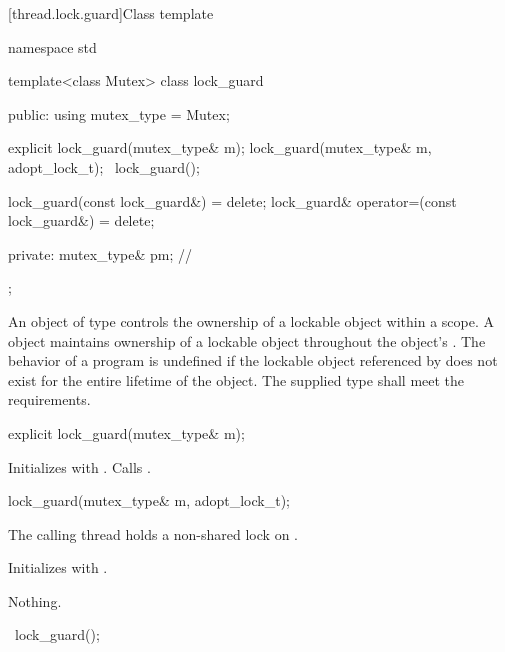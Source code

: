 [thread.lock.guard]{Class template }

%
\begin{codeblock}
namespace std {
  template<class Mutex>
  class lock_guard {
  public:
    using mutex_type = Mutex;

    explicit lock_guard(mutex_type& m);
    lock_guard(mutex_type& m, adopt_lock_t);
    ~lock_guard();

    lock_guard(const lock_guard&) = delete;
    lock_guard& operator=(const lock_guard&) = delete;

  private:
    mutex_type& pm;             // \expos
  };
}
\end{codeblock}

\pnum
An object of type  controls the ownership of a lockable object
within a scope. A  object maintains ownership of a lockable
object throughout the  object's .
The behavior of a program is undefined if the lockable object referenced by
 does not exist for the entire lifetime of the 
object. The supplied  type shall meet the 
requirements.

%
\begin{itemdecl}
explicit lock_guard(mutex_type& m);
\end{itemdecl}

\begin{itemdescr}
\pnum
\effects
Initializes  with . Calls .
\end{itemdescr}

%
\begin{itemdecl}
lock_guard(mutex_type& m, adopt_lock_t);
\end{itemdecl}

\begin{itemdescr}
\pnum
\expects
The calling thread holds a non-shared lock on .

\pnum
\effects
Initializes  with .

\pnum
\throws
Nothing.
\end{itemdescr}

%
\begin{itemdecl}
~lock_guard();
\end{itemdecl}

